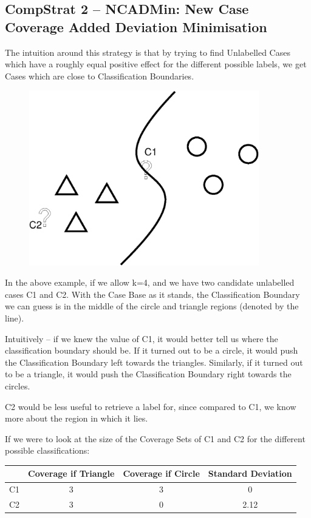 \documentclass[a4paper,11pt]{report}
\begin{document}
\subsection{CompStrat 2 – NCADMin: New Case Coverage Added Deviation Minimisation}

The intuition around this strategy is that by trying to find Unlabelled Cases which have a roughly equal positive effect for the different possible labels, we get Cases which are close to Classification Boundaries.

\begin{figure}[h!] \centering
\includegraphics[width=10cm]{./Drawn/NCADMin}
\end{figure}

In the above example, if we allow k=4, and we have two candidate unlabelled cases C1 and C2. With the Case Base as it stands, the Classification Boundary we can guess is in the middle of the circle and triangle regions (denoted by the line).
 
Intuitively – if we knew the value of C1, it would better tell us where the classification boundary should be. If it turned out to be a circle, it would push the Classification Boundary left towards the triangles. Similarly, if it turned out to be a triangle, it would push the Classification Boundary right towards the circles. 

C2 would be less useful to retrieve a label for, since compared to C1, we know more about the region in which it lies.

If we were to look at the size of the Coverage Sets of C1 and C2 for the different possible classifications:

\begin{tabular}{|c|c|c|c|}
\cline{2-4} 
\multicolumn{1}{c|}{} & Coverage if Triangle & Coverage if Circle & Standard Deviation\tabularnewline
\hline 
C1 & 3 & 3 & 0\tabularnewline
\hline 
C2 & 3 & 0 & 2.12\tabularnewline
\hline 
\end{tabular}
\end{document}
